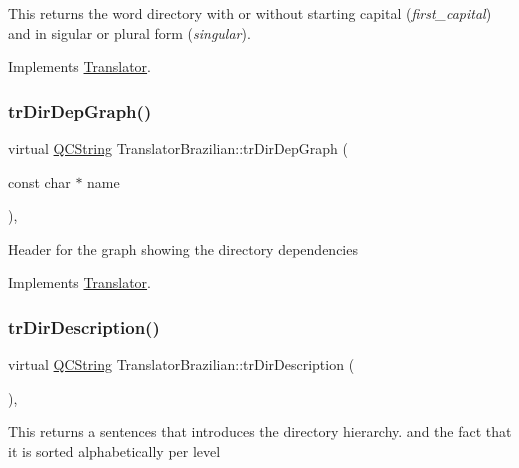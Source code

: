 This returns the word directory with or without starting capital ({\itshape first\+\_\+capital}) and in sigular or plural form ({\itshape singular}). 

Implements \mbox{\hyperlink{class_translator}{Translator}}.

\mbox{\label{class_translator_brazilian_aafbcdf689dab8f8d0d00095ee0c8a177}} 
\subsubsection{\texorpdfstring{trDirDepGraph()}{trDirDepGraph()}}
{\footnotesize\ttfamily virtual \mbox{\hyperlink{class_q_c_string}{Q\+C\+String}} Translator\+Brazilian\+::tr\+Dir\+Dep\+Graph (\begin{DoxyParamCaption}\item[{const char $\ast$}]{name }\end{DoxyParamCaption})\hspace{0.3cm}{\ttfamily [inline]}, {\ttfamily [virtual]}}

Header for the graph showing the directory dependencies 

Implements \mbox{\hyperlink{class_translator}{Translator}}.

\mbox{\label{class_translator_brazilian_a5ae1a101ed3429744ab768c8a5180ed1}} 
\subsubsection{\texorpdfstring{trDirDescription()}{trDirDescription()}}
{\footnotesize\ttfamily virtual \mbox{\hyperlink{class_q_c_string}{Q\+C\+String}} Translator\+Brazilian\+::tr\+Dir\+Description (\begin{DoxyParamCaption}{ }\end{DoxyParamCaption})\hspace{0.3cm}{\ttfamily [inline]}, {\ttfamily [virtual]}}

This returns a sentences that introduces the directory hierarchy. and the fact that it is sorted alphabetically per level 

